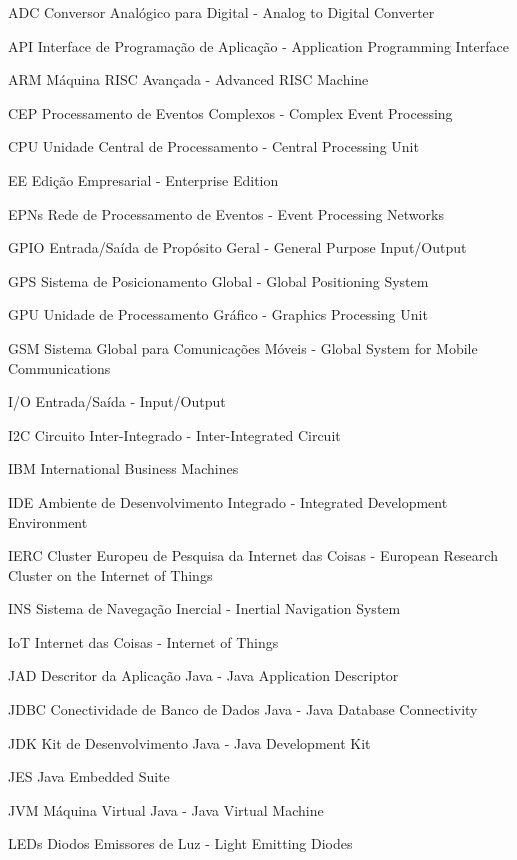 \begin{siglas}
	\item[ADC] Conversor Analógico para Digital - Analog to Digital Converter
	\item[API] Interface de Programação de Aplicação - Application Programming 	
	Interface
	\item[ARM] Máquina RISC Avançada - Advanced RISC Machine
	\item[CEP] Processamento de Eventos Complexos - Complex Event Processing
	\item[CPU] Unidade Central de Processamento - Central Processing Unit
	\item[EE] Edição Empresarial - Enterprise Edition
	\item[EPNs] Rede de Processamento de Eventos - Event Processing Networks
	\item[GPIO] Entrada/Saída de Propósito Geral - General Purpose Input/Output
	\item[GPS] Sistema de Posicionamento Global - Global Positioning System
	\item[GPU] Unidade de Processamento Gráfico - Graphics Processing Unit
	\item[GSM] Sistema Global para Comunicações Móveis - Global System for 	
	Mobile Communications
	\item[I/O] Entrada/Saída - Input/Output
	\item[I2C] Circuito Inter-Integrado - Inter-Integrated Circuit
	\item[IBM] International Business Machines
	\item[IDE] Ambiente de Desenvolvimento Integrado - Integrated Development 	
	Environment
	\item[IERC] Cluster Europeu de Pesquisa da Internet das Coisas - European	
	Research Cluster on the Internet of Things
	\item[INS] Sistema de Navegação Inercial - Inertial Navigation System
	\item[IoT] Internet das Coisas - Internet of Things
	\item[JAD] Descritor da Aplicação Java - Java Application Descriptor
	\item[JDBC] Conectividade de Banco de Dados Java - Java Database Connectivity
	\item[JDK] Kit de Desenvolvimento Java - Java Development Kit
	\item[JES] Java Embedded Suite
	\item[JVM] Máquina Virtual Java - Java Virtual Machine
	\item[LEDs] Diodos Emissores de Luz - Light Emitting Diodes

\end{siglas}
